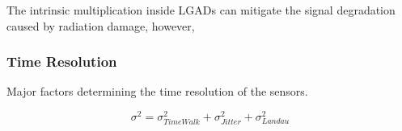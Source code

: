 The intrinsic multiplication inside LGADs can mitigate the signal degradation caused by radiation damage, however, 

\subsubsection{Time Resolution}

Major factors determining the time resolution of the sensors.

\begin{equation}
    \sigma^2 = \sigma_{TimeWalk}^2 + \sigma_{Jitter}^2 + \sigma_{Landau}^2
\end{equation}





                 